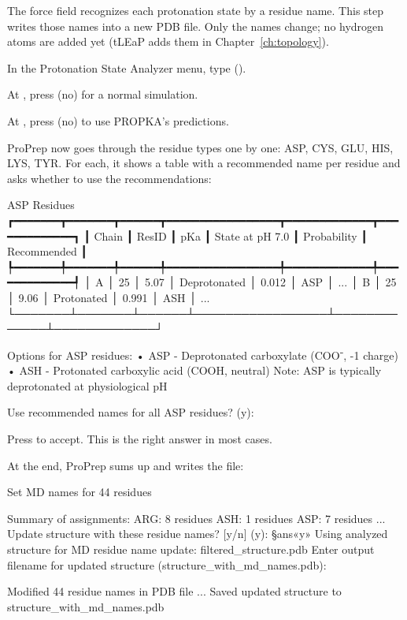 The force field recognizes each protonation state by a residue name. This step
writes those names into a new PDB file. Only the names change; no hydrogen
atoms are added yet (tLEaP adds them in Chapter~\ref{ch:topology}).

\begin{steps}
  \item In the Protonation State Analyzer menu, type 
        ().
  \item At , press
         (no) for a normal simulation.
  \item At , press  (no) to use PROPKA's predictions.
  \item ProPrep now goes through the residue types one by one: ASP, CYS, GLU,
        HIS, LYS, TYR. For each, it shows a table with a recommended name per
        residue and asks whether to use the recommendations:
\begin{screen}
                             ASP Residues
┏━━━━━━━┳━━━━━━━┳━━━━━━┳━━━━━━━━━━━━━━━━━┳━━━━━━━━━━━━━┳━━━━━━━━━━━━━┓
┃ Chain ┃ ResID ┃ pKa  ┃ State at pH 7.0 ┃ Probability ┃ Recommended ┃
┡━━━━━━━╇━━━━━━━╇━━━━━━╇━━━━━━━━━━━━━━━━━╇━━━━━━━━━━━━━╇━━━━━━━━━━━━━┩
│ A     │ 25    │ 5.07 │ Deprotonated    │ 0.012       │ ASP         │
...
│ B     │ 25    │ 9.06 │ Protonated      │ 0.991       │ ASH         │
...
└───────┴───────┴──────┴─────────────────┴─────────────┴─────────────┘

Options for ASP residues:
• ASP - Deprotonated carboxylate (COO⁻, -1 charge)
• ASH - Protonated carboxylic acid (COOH, neutral)
Note: ASP is typically deprotonated at physiological pH

Use recommended names for all ASP residues? (y):
\end{screen}
        Press  to accept. This is the right answer in most cases.
  \item At the end, ProPrep sums up and writes the file:
\begin{screen}
Set MD names for 44 residues

Summary of assignments:
  ARG: 8 residues
  ASH: 1 residues
  ASP: 7 residues
...
Update structure with these residue names? [y/n] (y): §ans«y»
Using analyzed structure for MD residue name update: filtered_structure.pdb
Enter output filename for updated structure (structure_with_md_names.pdb):

Modified 44 residue names in PDB file
...
Saved updated structure to structure_with_md_names.pdb
\end{screen}
\end{steps}

